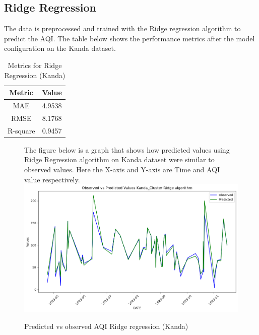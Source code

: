 \documentclass{book}
\numberwithin{equation}{section}
\numberwithin{figure}{section}
\begin{document}
\subsection{Ridge Regression}
The data is preprocessed and trained with the Ridge regression algorithm to predict the AQI. The table below shows the performance metrics after the model configuration on the Kanda dataset.\\
\begin{table}[H]
    \centering
    \begin{tabular}{|c|c|}
        \hline
        \textbf{Metric} & \textbf{Value} \\
        \hline
        MAE & 4.9538 \\
        \hline
        RMSE & 8.1768 \\
        \hline
        R-square & 0.9457 \\
        \hline
    \end{tabular}
    \caption{Metrics for Ridge Regression (Kanda)}
    \label{tab: Ridge metrics(Kanda)}
\end{table}
\begin{figure}[H]
 \begin{minipage}{\linewidth}
        The figure below is a graph that shows how predicted values using Ridge Regression algorithm on Kanda dataset were similar to observed values. Here the X-axis and Y-axis are Time and AQI value respectively.
        \vspace{0.5em} 
        \includegraphics[width=\linewidth]{Kanda Ridge.png}
       
        \caption{ Predicted vs observed AQI Ridge regression (Kanda)}
        \label{fig: Ridge predicted vs observed AQI(Kanda)}
    \end{minipage}
\end{figure}
\end{document}

